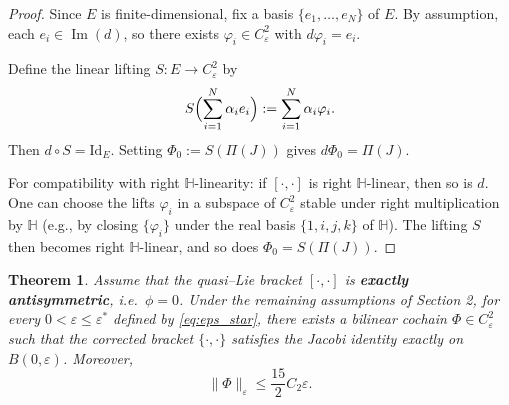 \documentclass[10pt]{amsart}
\numberwithin{equation}{section}
\newtheorem{thm}[theorem]{Theorem}
\theoremstyle{remark}
\theoremstyle{definition}
\begin{document}
\begin{proof}
Since \(E\) is finite-dimensional, fix a basis \(\{e_1, \dots, e_N\}\) of \(E\). By assumption, each \(e_i \in \operatorname{Im}(d)\), so there exists \(\varphi_i \in C_\varepsilon^2\) with \(d\varphi_i = e_i\).

Define the linear lifting \(S: E \to C_\varepsilon^2\) by
\[
S\Bigl(\sum_{i=1}^N \alpha_i e_i\Bigr) := \sum_{i=1}^N \alpha_i \varphi_i.
\]
Then \(d \circ S = \mathrm{Id}_E\). Setting \(\Phi_0 := S(\Pi(J))\) gives \(d\Phi_0 = \Pi(J)\).

For compatibility with right \(\mathbb{H}\)-linearity: if \([\cdot,\cdot]\) is right \(\mathbb{H}\)-linear, then so is \(d\). One can choose the lifts \(\varphi_i\) in a subspace of \(C_\varepsilon^2\) stable under right multiplication by \(\mathbb{H}\) (e.g., by closing \(\{\varphi_i\}\) under the real basis \(\{1,i,j,k\}\) of \(\mathbb{H}\)). The lifting \(S\) then becomes right \(\mathbb{H}\)-linear, and so does \(\Phi_0 = S(\Pi(J))\).
\end{proof}

\begin{thm}\label{thm:rigid}
Assume that the quasi--Lie bracket $[\cdot,\cdot]$ is \textbf{exactly antisymmetric}, i.e.\ $\phi = 0$. Under the remaining assumptions of Section 2, for every $0 < \varepsilon \leq \varepsilon^*$ defined by \eqref{eq:eps_star}, there exists a bilinear cochain $\Phi \in C_\varepsilon^2$ such that the corrected bracket $\{\cdot, \cdot\}$ satisfies the Jacobi identity exactly on $B(0, \varepsilon)$. Moreover,
\[
\|\Phi\|_\varepsilon \leq \frac{15}{2} C_2 \varepsilon.
\]
\end{thm}
\end{document}
